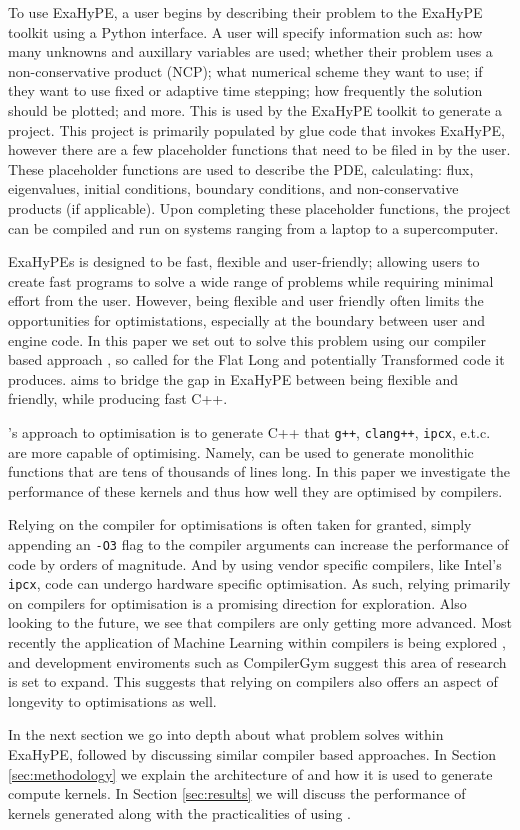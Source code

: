 To use ExaHyPE, a user begins by describing their problem to the ExaHyPE toolkit using a Python interface.
A user will specify information such as: how many unknowns and auxillary variables are used; whether their problem uses a non-conservative product (NCP); what numerical scheme they want to use; if they want to use fixed or adaptive time stepping; how frequently the solution should be plotted; and more.
This is used by the ExaHyPE toolkit to generate a project.
This project is primarily populated by glue code that invokes ExaHyPE, however there are a few placeholder functions that need to be filed in by the user.
These placeholder functions are used to describe the PDE, calculating: flux, eigenvalues, initial conditions, boundary conditions, and non-conservative products (if applicable).
Upon completing these placeholder functions, the project can be compiled and run on systems ranging from a laptop to a supercomputer.

ExaHyPEs is designed to be fast, flexible and user-friendly; allowing users to create fast programs to solve a wide range of problems while requiring minimal effort from the user.
However, being flexible and user friendly often limits the opportunities for optimistations, especially at the boundary between user and engine code.
In this paper we set out to solve this problem using our compiler based approach \phlat, so called for the Flat Long and potentially Transformed code it produces.
\phlat aims to bridge the gap in ExaHyPE between being flexible and friendly, while producing fast C++.  

\phlat{}'s approach to optimisation is to generate C++ that \texttt{g++}, \texttt{clang++}, \texttt{ipcx}, e.t.c. are more capable of optimising.  
Namely, \phlat can be used to generate monolithic functions that are tens of thousands of lines long.
In this paper we investigate the performance of these kernels and thus how well they are optimised by compilers.

Relying on the compiler for optimisations is often taken for granted, simply appending an \texttt{-O3} flag to the compiler arguments can increase the performance of code by orders of magnitude.
And by using vendor specific compilers, like Intel's \texttt{ipcx}, code can undergo hardware specific optimisation.
As such, relying primarily on compilers for optimisation is a promising direction for exploration.
Also looking to the future, we see that compilers are only getting more advanced.
Most recently the application of Machine Learning within compilers is being explored \cite{compiler-ml-opt,lots-of-compiler-options}, and development enviroments such as CompilerGym \cite{compiler-gym} suggest this area of research is set to expand.
This suggests that relying on compilers also offers an aspect of longevity to optimisations as well.

In the next section we go into depth about what problem \phlat solves within ExaHyPE, followed by discussing similar compiler based approaches.
In Section \ref{sec:methodology} we explain the architecture of \phlat and how it is used to generate compute kernels.
In Section \ref{sec:results} we will discuss the performance of kernels generated along with the practicalities of using \phlat.